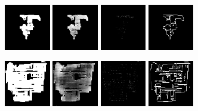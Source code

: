 \begin{figure}[h!]
\begin{minipage}[b]{\linewidth}
	\begin{center}
		\includegraphics[width=2cm]{figures/results/samples/uncond/sample4_map_floormap_generated.png}
		\includegraphics[width=2cm]{figures/results/samples/uncond/sample4_map_heightmap_generated.png}
		\includegraphics[width=2cm]{figures/results/samples/uncond/sample4_map_thingsmap_generated.png}
		\includegraphics[width=2cm]{figures/results/samples/uncond/sample4_map_wallmap_generated.png}
	\end{center}
	
	\begin{center}
		\includegraphics[width=2cm]{figures/results/samples/uncond/sample6_map_floormap_generated.png}
		\includegraphics[width=2cm]{figures/results/samples/uncond/sample6_map_heightmap_generated.png}
		\includegraphics[width=2cm]{figures/results/samples/uncond/sample6_map_thingsmap_generated.png}
		\includegraphics[width=2cm]{figures/results/samples/uncond/sample6_map_wallmap_generated.png}
	\end{center}
	

\end{minipage}
\end{figure}
